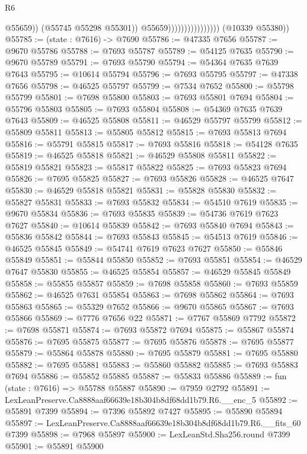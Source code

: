 \begin{lexlean}{R6}
\begin{coremodule}
                                            @55659))
                                        (@55745 @55298 @55301))
                                      @55659))))))))))))))))
      (@10339 @55380))
@55785 := (state : @7616) -> @7690
@55786 := @47335 @7656
@55787 := @9670 @55786
@55788 := @7693 @55787
@55789 := @54125 @7635
@55790 := @9670 @55789
@55791 := @7693 @55790
@55794 := @54364 @7635 @7639 @7643
@55795 := @10614 @55794
@55796 := @7693 @55795
@55797 := @47338 @7656
@55798 := @46525 @55797
@55799 := @7534 @7652
@55800 := @55798 @55799
@55801 := @7698 @55800
@55803 := @7693 @55801 @7694
@55804 := @55796 @55803
@55805 := @7693 @55804
@55808 := @54369 @7635 @7639 @7643
@55809 := @46525 @55808
@55811 := @46529 @55797 @55799
@55812 := @55809 @55811
@55813 := @55805 @55812
@55815 := @7693 @55813 @7694
@55816 := @55791 @55815
@55817 := @7693 @55816
@55818 := @54128 @7635
@55819 := @46525 @55818
@55821 := @46529 @55808 @55811
@55822 := @55819 @55821
@55823 := @55817 @55822
@55825 := @7693 @55823 @7694
@55826 := @7695 @55825
@55827 := @7693 @55826
@55828 := @46525 @7647
@55830 := @46529 @55818 @55821
@55831 := @55828 @55830
@55832 := @55827 @55831
@55833 := @7693 @55832
@55834 := @54510 @7619
@55835 := @9670 @55834
@55836 := @7693 @55835
@55839 := @54736 @7619 @7623 @7627
@55840 := @10614 @55839
@55842 := @7693 @55840 @7694
@55843 := @55836 @55842
@55844 := @7693 @55843
@55845 := @54513 @7619
@55846 := @46525 @55845
@55849 := @54741 @7619 @7623 @7627
@55850 := @55846 @55849
@55851 := @55844 @55850
@55852 := @7693 @55851
@55854 := @46529 @7647 @55830
@55855 := @46525 @55854
@55857 := @46529 @55845 @55849
@55858 := @55855 @55857
@55859 := @7698 @55858
@55860 := @7693 @55859
@55862 := @46525 @7631 @55854
@55863 := @7698 @55862
@55864 := @7693 @55863
@55865 := @55329 @7652
@55866 := @9670 @55865
@55867 := @7693 @55866
@55869 := @7776 @7656 @22
@55871 := @7767 @55869 @7792
@55872 := @7698 @55871
@55874 := @7693 @55872 @7694
@55875 := @55867 @55874
@55876 := @7695 @55875
@55877 := @7695 @55876
@55878 := @7695 @55877
@55879 := @55864 @55878
@55880 := @7695 @55879
@55881 := @7695 @55880
@55882 := @7695 @55881
@55883 := @55860 @55882
@55885 := @7693 @55883 @7694
@55886 := @55852 @55885
@55887 := @55833 @55886
@55889 := fun (state : @7616) => @55788 @55887
@55890 := @7959 @2792
@55891 := LexLeanPreserve.Ca8888aaf66639e18b304b8df68dd1b79.R6.__enc_5
@55892 := @55891 @7399
@55894 := @7396 @55892 @7427
@55895 := @55890 @55894
@55897 := LexLeanPreserve.Ca8888aaf66639e18b304b8df68dd1b79.R6.__fits_60 @7399
@55898 := @7968 @55897
@55900 := LexLeanStd.Sha256.round @7399
@55901 := @55891 @55900

\end{coremodule}
\end{lexlean}
